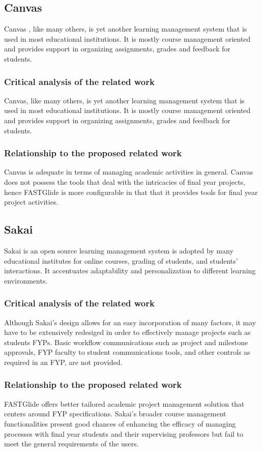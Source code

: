 \documentclass{FastFyp}
\begin{document}
\subsection{Canvas}
Canvas \cite{ref:canvas}, like many others, is yet another learning management system that is used in most educational institutions. It is mostly course management oriented and provides support in organizing assignments, grades and feedback for students.
\subsubsection{Critical analysis of the related work}
Canvas, like many others, is yet another learning management system that is used in most educational institutions. It is mostly course management oriented and provides support in organizing assignments, grades and feedback for students.
\subsubsection{Relationship to the proposed related work}
Canvas is adequate in terms of managing academic activities in general. Canvas does not possess the tools that deal with the intricacies of final year projects, hence FASTGlide is more configurable in that that it provides tools for final year project activities.
\subsection{Sakai}
Sakai \cite{ref:sakai} is an open source learning management system is adopted by many educational institutes for online courses, grading of students, and students’ interactions. It accentuates adaptability and personalization to different learning environments.
\subsubsection{Critical analysis of the related work}
Although Sakai’s design allows for an easy incorporation of many factors, it may have to be extensively redesiged in order to effectively manage projects such as students FYPs. Basic workflow communications such as project and milestone approvals, FYP faculty to student communications tools, and other controls as required in an FYP, are not provided.
\subsubsection{Relationship to the proposed related work}
FASTGlide offers better tailored academic project management solution that centers around FYP specifications. Sakai’s broader course management functionalities present good chances of enhancing the efficacy of managing processes with final year students and their supervising professors but fail to meet the general requirements of the users.
\end{document}
